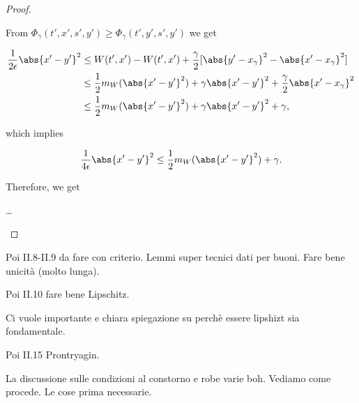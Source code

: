 \begin{proof}
\begin{enumerate}
        From $\Phi_{\gamma}(t',x',s',y')\geq\Phi_{\gamma}(t',y',s',y')$ we get

        \begin{align*}
            \frac{1}{2\epsilon}\abs{x'-y'}^2 & \leq W(t',x')-W(t',x') + \frac{\gamma}{2}[\abs{y'-x_{\gamma}}^2-\abs{x'-x_{\gamma}}^2] \\
            & \leq \frac{1}{2}m_W(\abs{x'-y'}^2) + \gamma\abs{x'-y'}^2 + \frac{\gamma}{2}\abs{x'-x_{\gamma}}^2 \\
            & \leq \frac{1}{2}m_W(\abs{x'-y'}^2) + \gamma\abs{x'-y'}^2 + \gamma,
        \end{align*}

        which implies

        \[\frac{1}{4\epsilon}\abs{x'-y'}^2\leq \frac{1}{2}m_W(\abs{x'-y'}^2)+\gamma.\]

        Therefore, we get

        \dots
    \end{enumerate}
\end{proof}

Poi II.8-II.9 da fare con criterio. Lemmi super tecnici dati per buoni. Fare bene unicità (molto lunga).

Poi II.10 fare bene Lipschitz.

Ci vuole importante e chiara spiegazione su perchè essere lipshizt sia fondamentale.

Poi II.15 Prontryagin.

La discussione sulle condizioni al constorno e robe varie boh. Vediamo come procede. Le cose prima necessarie.  
